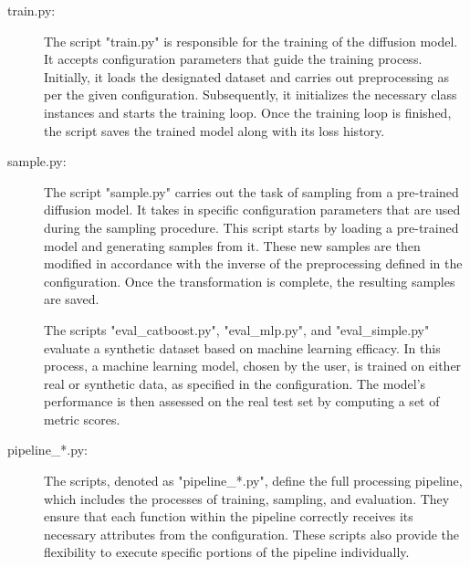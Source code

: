 \begin{description}
	\item[train.py:]
		The script "train.py" is responsible for the training of the diffusion model. 
		It accepts configuration parameters that guide the training process. 
		Initially, it loads the designated dataset and carries out preprocessing as per the given configuration. 
		Subsequently, it initializes the necessary class instances and starts the training loop. 
		Once the training loop is finished, the script saves the trained model along with its loss history.

	\item[sample.py:]
		The script "sample.py" carries out the task of sampling from a pre-trained diffusion model. 
		It takes in specific configuration parameters that are used during the sampling procedure. 
		This script starts by loading a pre-trained model and generating samples from it. 
		These new samples are then modified in accordance with the inverse of the preprocessing defined in the configuration.
		Once the transformation is complete, the resulting samples are saved.

	\item[]
		The scripts "eval_catboost.py", "eval_mlp.py", and "eval_simple.py" evaluate a synthetic dataset based on machine learning efficacy. 
		In this process, a machine learning model, chosen by the user, is trained on either real or synthetic data, as specified in the configuration. 
		The model's performance is then assessed on the real test set by computing a set of metric scores.

	\item[pipeline\_*.py\footnotemark:]
		The scripts, denoted as "pipeline_*.py", define the full processing pipeline, which includes the processes of training, sampling, and evaluation. 
		They ensure that each function within the pipeline correctly receives its necessary attributes from the configuration. 
		These scripts also provide the flexibility to execute specific portions of the pipeline individually.


\end{description}

